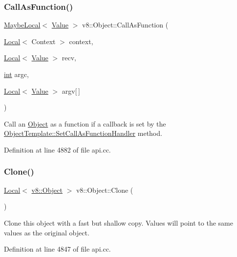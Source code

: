 \subsubsection{\texorpdfstring{Call\+As\+Function()}{CallAsFunction()}}
{\footnotesize\ttfamily \mbox{\hyperlink{classv8_1_1MaybeLocal}{Maybe\+Local}}$<$ \mbox{\hyperlink{classv8_1_1Value}{Value}} $>$ v8\+::\+Object\+::\+Call\+As\+Function (\begin{DoxyParamCaption}\item[{\mbox{\hyperlink{classv8_1_1Local}{Local}}$<$ Context $>$}]{context,  }\item[{\mbox{\hyperlink{classv8_1_1Local}{Local}}$<$ \mbox{\hyperlink{classv8_1_1Value}{Value}} $>$}]{recv,  }\item[{\mbox{\hyperlink{classint}{int}}}]{argc,  }\item[{\mbox{\hyperlink{classv8_1_1Local}{Local}}$<$ \mbox{\hyperlink{classv8_1_1Value}{Value}} $>$}]{argv\mbox{[}$\,$\mbox{]} }\end{DoxyParamCaption})}

Call an \mbox{\hyperlink{classv8_1_1Object}{Object}} as a function if a callback is set by the \mbox{\hyperlink{classv8_1_1ObjectTemplate_a1775c8f73e643c339804d2f5b628eddf}{Object\+Template\+::\+Set\+Call\+As\+Function\+Handler}} method. 

Definition at line 4882 of file api.\+cc.

\mbox{\label{classv8_1_1Object_a68b17d2eada7c18c1fdb5e2f104c7766}} 
\subsubsection{\texorpdfstring{Clone()}{Clone()}}
{\footnotesize\ttfamily \mbox{\hyperlink{classv8_1_1Local}{Local}}$<$ \mbox{\hyperlink{classv8_1_1Object}{v8\+::\+Object}} $>$ v8\+::\+Object\+::\+Clone (\begin{DoxyParamCaption}{ }\end{DoxyParamCaption})}

Clone this object with a fast but shallow copy. Values will point to the same values as the original object. 

Definition at line 4847 of file api.\+cc.

\mbox{\label{classv8_1_1Object_ac8c025cd67f4820a840789235bdde6cb}} 
